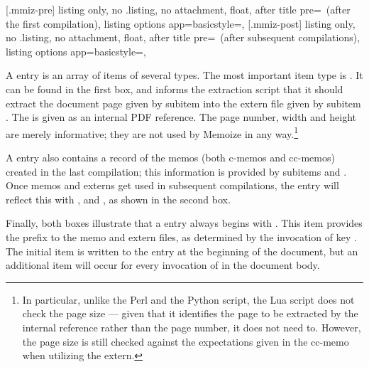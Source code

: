 \documentclass[a4paper,11pt]{article}
\begin{document}
[.mmiz-pre]{
  listing only, no .listing, no attachment, float,
  after title pre={\ (after the first compilation)},
  listing options app={basicstyle=\ttfamily\fontsize{7.7pt}{9.24pt}\selectfont},
}
[.mmiz-post]{
  listing only, no .listing, no attachment, float,
  after title pre={\ (after subsequent compilations)},
  listing options app={basicstyle=\ttfamily\fontsize{7.7pt}{9.24pt}\selectfont},
}

A  entry is an array of items of several types.  The most
important item type is .  It can be found in the first box,
and informs the extraction script that it should extract the document page
given by subitem  into the extern file given by subitem
.  The  is given as an internal PDF reference.
The page number, width and height are merely informative; they are not used by
Memoize in any way.\footnote{In particular, unlike the Perl and the Python
  script, the Lua script does not check the page size --- given that it
  identifies the page to be extracted by the internal reference rather than the
  page number, it does not need to.  However, the page size is still checked
  against the expectations given in the cc-memo when utilizing the extern.}

A  entry also contains a record of the memos (both c-memos and
cc-memos) created in the last compilation; this information is provided by
subitems  and .  Once memos and externs
get used in subsequent compilations, the  entry will reflect
this with ,  and ,
as shown in the second box.

Finally, both boxes illustrate that a  entry always begins with
.  This item provides the prefix to the memo and extern files,
as determined by the invocation of key .  The initial
 item is written to the  entry at the beginning
of the document, but an additional  item will occur for every
invocation of  in the document body.
\end{document}
